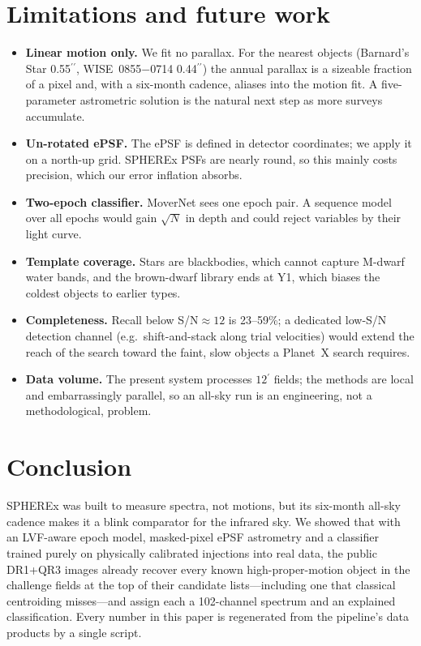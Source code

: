 \documentclass[10pt,twocolumn]{article}
\newcommand{\asec}{\ensuremath{^{\prime\prime}}}
\newcommand{\amin}{\ensuremath{^{\prime}}}
\newcommand{\SN}{S/N}
\newcommand{\wise}{WISE~0855$-$0714}
\begin{document}
\section{Limitations and future work}
\label{sec:limits}

\begin{itemize}
  \item \textbf{Linear motion only.} We fit no parallax. For the nearest objects (Barnard's Star 0.55\asec,
        \wise{} 0.44\asec) the annual parallax is a sizeable fraction of a pixel and, with a six-month
        cadence, aliases into the motion fit. A five-parameter astrometric solution is the natural next
        step as more surveys accumulate.
  \item \textbf{Un-rotated ePSF.} The ePSF is defined in detector coordinates; we apply it on a north-up
        grid. SPHEREx PSFs are nearly round, so this mainly costs precision, which our error inflation absorbs.
  \item \textbf{Two-epoch classifier.} MoverNet sees one epoch pair. A sequence model over all epochs
        would gain $\sqrt{N}$ in depth and could reject variables by their light curve.
  \item \textbf{Template coverage.} Stars are blackbodies, which cannot capture M-dwarf water bands, and the
        brown-dwarf library ends at Y1, which biases the coldest objects to earlier types.
  \item \textbf{Completeness.} Recall below \SN{}$\approx12$ is 23--59\%; a dedicated low-\SN{} detection
        channel (e.g.\ shift-and-stack along trial velocities) would extend the reach of the search toward
        the faint, slow objects a Planet~X search requires.
  \item \textbf{Data volume.} The present system processes $12\amin$ fields; the methods are local and
        embarrassingly parallel, so an all-sky run is an engineering, not a methodological, problem.
\end{itemize}

\section{Conclusion}

SPHEREx was built to measure spectra, not motions, but its six-month all-sky cadence makes it a
blink comparator for the infrared sky. We showed that with an LVF-aware epoch model, masked-pixel ePSF
astrometry and a classifier trained purely on physically calibrated injections into real data, the
public DR1+QR3 images already recover every known high-proper-motion object in the challenge fields at the
top of their candidate lists---including one that classical centroiding misses---and assign each a
102-channel spectrum and an explained classification. Every number in this paper is regenerated from the
pipeline's data products by a single script.
\end{document}
